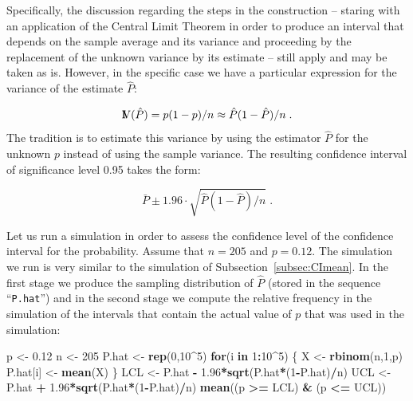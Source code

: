 \documentclass[]{krantz}
\makeatletter
\newenvironment{Shaded}{\begin{snugshade}}{\end{snugshade}}
\newcommand{\KeywordTok}[1]{\textcolor[rgb]{0.13,0.29,0.53}{\textbf{#1}}}
\newcommand{\DecValTok}[1]{\textcolor[rgb]{0.00,0.00,0.81}{#1}}
\newcommand{\FloatTok}[1]{\textcolor[rgb]{0.00,0.00,0.81}{#1}}
\newcommand{\StringTok}[1]{\textcolor[rgb]{0.31,0.60,0.02}{#1}}
\newcommand{\ControlFlowTok}[1]{\textcolor[rgb]{0.13,0.29,0.53}{\textbf{#1}}}
\newcommand{\OperatorTok}[1]{\textcolor[rgb]{0.81,0.36,0.00}{\textbf{#1}}}
\newcommand{\NormalTok}[1]{#1}
\newcommand{\Var}{{\rm I\kern-.3em V}}
\newenvironment{kframe}{%
\medskip{}
\setlength{\fboxsep}{.8em}
 \def\at@end@of@kframe{}%
 \ifinner\ifhmode%
  \def\at@end@of@kframe{\end{minipage}}%
  \begin{minipage}{\columnwidth}%
 \fi\fi%
 \def\FrameCommand##1{\hskip\@totalleftmargin \hskip-\fboxsep
 \colorbox{shadecolor}{##1}\hskip-\fboxsep
     \hskip-\linewidth \hskip-\@totalleftmargin \hskip\columnwidth}%
 \MakeFramed {\advance\hsize-\width
   \@totalleftmargin\z@ \linewidth\hsize
   \@setminipage}}%
 {\par\unskip\endMakeFramed%
 \at@end@of@kframe}
\renewenvironment{Shaded}{\begin{kframe}}{\end{kframe}}
\theoremstyle{definition}
\theoremstyle{definition}
\theoremstyle{definition}
\theoremstyle{remark}
\makeatother
\begin{document}
Specifically, the discussion regarding the steps in the construction --
staring with an application of the Central Limit Theorem in order to
produce an interval that depends on the sample average and its variance
and proceeding by the replacement of the unknown variance by its
estimate -- still apply and may be taken as is. However, in the specific
case we have a particular expression for the variance of the estimate
\(\hat P\):

\[\Var(\hat P) = p(1-p)/n \approx \hat P(1- \hat P) /n\;.\] The
tradition is to estimate this variance by using the estimator \(\hat P\)
for the unknown \(p\) instead of using the sample variance. The
resulting confidence interval of significance level 0.95 takes the form:

\[\bar P \pm 1.96 \cdot\sqrt{ \hat P(1-\hat P)/n}\;.\]

Let us run a simulation in order to assess the confidence level of the
confidence interval for the probability. Assume that \(n=205\) and
\(p=0.12\). The simulation we run is very similar to the simulation of
Subsection~\ref{subsec:CImean}. In the first stage we produce the
sampling distribution of \(\hat P\) (stored in the sequence
``\texttt{P.hat}'') and in the second stage we compute the relative
frequency in the simulation of the intervals that contain the actual
value of \(p\) that was used in the simulation:

\begin{Shaded}
\begin{Highlighting}[]
\NormalTok{p <-}\StringTok{ }\FloatTok{0.12}
\NormalTok{n <-}\StringTok{ }\DecValTok{205}
\NormalTok{P.hat <-}\StringTok{ }\KeywordTok{rep}\NormalTok{(}\DecValTok{0}\NormalTok{,}\DecValTok{10}\OperatorTok{^}\DecValTok{5}\NormalTok{)}
\ControlFlowTok{for}\NormalTok{(i }\ControlFlowTok{in} \DecValTok{1}\OperatorTok{:}\DecValTok{10}\OperatorTok{^}\DecValTok{5}\NormalTok{) \{}
\NormalTok{  X <-}\StringTok{ }\KeywordTok{rbinom}\NormalTok{(n,}\DecValTok{1}\NormalTok{,p)}
\NormalTok{  P.hat[i] <-}\StringTok{ }\KeywordTok{mean}\NormalTok{(X)}
\NormalTok{\}}
\NormalTok{LCL <-}\StringTok{ }\NormalTok{P.hat }\OperatorTok{-}\StringTok{ }\FloatTok{1.96}\OperatorTok{*}\KeywordTok{sqrt}\NormalTok{(P.hat}\OperatorTok{*}\NormalTok{(}\DecValTok{1}\OperatorTok{-}\NormalTok{P.hat)}\OperatorTok{/}\NormalTok{n)}
\NormalTok{UCL <-}\StringTok{ }\NormalTok{P.hat }\OperatorTok{+}\StringTok{ }\FloatTok{1.96}\OperatorTok{*}\KeywordTok{sqrt}\NormalTok{(P.hat}\OperatorTok{*}\NormalTok{(}\DecValTok{1}\OperatorTok{-}\NormalTok{P.hat)}\OperatorTok{/}\NormalTok{n)}
\KeywordTok{mean}\NormalTok{((p }\OperatorTok{>=}\StringTok{ }\NormalTok{LCL) }\OperatorTok{&}\StringTok{ }\NormalTok{(p }\OperatorTok{<=}\StringTok{ }\NormalTok{UCL))}
\end{Highlighting}
\end{Shaded}
\end{document}
